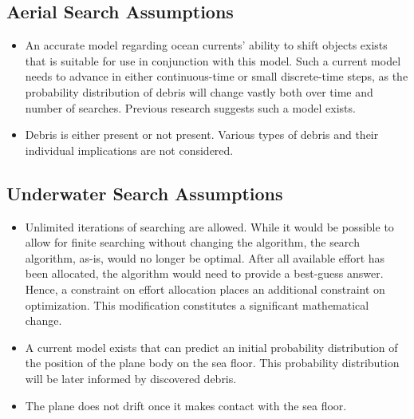 \subsection{Aerial Search Assumptions}

\begin{itemize}
\item An accurate model regarding ocean currents' ability to shift objects exists that is suitable for use in conjunction with this model. Such a current model needs to advance in either continuous-time or small discrete-time steps, as the probability distribution of debris will change vastly both over time and number of searches. Previous research suggests such a model exists. 
\item Debris is either present or not present. Various types of debris and their individual implications are not considered. 
\end{itemize}

\subsection{Underwater Search Assumptions}

\begin{itemize}
\item Unlimited iterations of searching are allowed. While it would be possible to allow for finite searching without changing the algorithm, the search algorithm, as-is, would no longer be optimal. 
After all available effort has been allocated, the algorithm would need to provide a best-guess answer. Hence, a constraint on effort allocation places an additional constraint on optimization. This modification constitutes a significant mathematical change.
\item A current model exists that can predict an initial probability distribution of the position of the plane body on the sea floor. This probability distribution will be later informed by discovered debris.
\item The plane does not drift once it makes contact with the sea floor.   
\end{itemize}